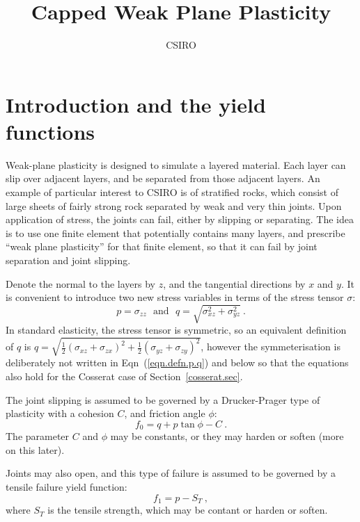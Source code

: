 \documentclass[]{scrreprt}
\begin{document}
\title{Capped Weak Plane Plasticity}
\author{CSIRO}
\maketitle

\tableofcontents


\chapter{Introduction and the yield functions}

Weak-plane plasticity is designed to simulate a layered material.
Each layer can slip over adjacent layers, and be separated from those
adjacent layers.  An example of particular interest to CSIRO is of
stratified rocks, which consist of large sheets of fairly strong rock
separated by weak and very thin joints.  Upon application of stress,
the joints can fail, either by slipping or separating.  The idea is to
use one finite element that potentially contains many layers, and
prescribe ``weak plane plasticity'' for that finite element, so that
it can fail by joint separation and joint slipping.

Denote the normal to the layers by $z$, and the tangential directions
by $x$ and $y$.  It is convenient to introduce two new stress variables in
terms of the stress tensor $\sigma$:
\begin{equation}
p = \sigma_{zz} \ \ \ \mbox{and}\ \ \ q = \sqrt{\sigma_{xz}^{2} +
  \sigma_{yz}^{2}} \ .
\label{eqn.defn.p.q}
\end{equation}
In standard elasticity, the stress tensor is symmetric, so an
equivalent definition of $q$ is
$q=\sqrt{\mbox{$\frac{1}{2}$}(\sigma_{xz}+\sigma_{zx})^{2} +
  \mbox{$\frac{1}{2}$}(\sigma_{yz}+\sigma_{zy})^{2}}$, however the
symmeterisation is deliberately not written in
Eqn~(\ref{eqn.defn.p.q}) and below so that the equations also hold for
the Cosserat case of Section~\ref{cosserat.sec}.

The joint slipping is assumed to be governed by a
Drucker-Prager type of plasticity with a cohesion $C$, and friction
angle $\phi$:
\begin{equation}
f_{0} = q + p\tan\phi - C \ .
\end{equation}
The parameter $C$ and $\phi$ may be constants, or they may harden or
soften (more on this later).

Joints may also open, and this type of failure is assumed to be
governed by a tensile failure yield function:
\begin{equation}
f_{1} = p - S_{T} \ ,
\end{equation}
where $S_{T}$ is the tensile strength, which may be contant or harden
or soften.
\end{document}
